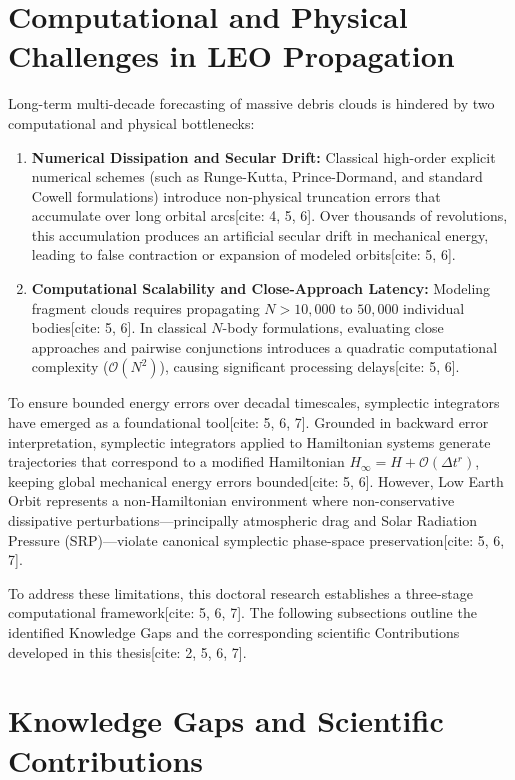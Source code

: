 \documentclass[12pt,letterpaper,twoside]{book}
\begin{document}
\section{Computational and Physical Challenges in LEO Propagation}

Long-term multi-decade forecasting of massive debris clouds is hindered by two computational and physical bottlenecks:
\begin{enumerate}
    \item \textbf{Numerical Dissipation and Secular Drift:} Classical high-order explicit numerical schemes (such as Runge-Kutta, Prince-Dormand, and standard Cowell formulations) introduce non-physical truncation errors that accumulate over long orbital arcs[cite: 4, 5, 6]. Over thousands of revolutions, this accumulation produces an artificial secular drift in mechanical energy, leading to false contraction or expansion of modeled orbits[cite: 5, 6].
    \item \textbf{Computational Scalability and Close-Approach Latency:} Modeling fragment clouds requires propagating $N > 10,000$ to $50,000$ individual bodies[cite: 5, 6]. In classical $N$-body formulations, evaluating close approaches and pairwise conjunctions introduces a quadratic computational complexity ($\mathcal{O}(N^2)$), causing significant processing delays[cite: 5, 6].
\end{enumerate}

To ensure bounded energy errors over decadal timescales, symplectic integrators have emerged as a foundational tool[cite: 5, 6, 7]. Grounded in backward error interpretation, symplectic integrators applied to Hamiltonian systems generate trajectories that correspond to a modified Hamiltonian $H_\infty = H + \mathcal{O}(\Delta t^r)$, keeping global mechanical energy errors bounded[cite: 5, 6]. However, Low Earth Orbit represents a non-Hamiltonian environment where non-conservative dissipative perturbations—principally atmospheric drag and Solar Radiation Pressure (SRP)—violate canonical symplectic phase-space preservation[cite: 5, 6, 7].

To address these limitations, this doctoral research establishes a three-stage computational framework[cite: 5, 6, 7]. The following subsections outline the identified Knowledge Gaps and the corresponding scientific Contributions developed in this thesis[cite: 2, 5, 6, 7].

\section{Knowledge Gaps and Scientific Contributions}
\end{document}
